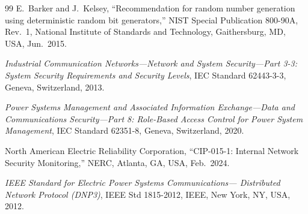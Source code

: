 \documentclass[conference]{IEEEtran}
\begin{document}
\begin{thebibliography}{99}
E.~Barker and J.~Kelsey, ``Recommendation for random number
generation using deterministic random bit generators,'' NIST Special
Publication 800-90A, Rev.~1, National Institute of Standards and
Technology, Gaithersburg, MD, USA, Jun.~2015.

\emph{Industrial Communication Networks---Network and System
Security---Part 3-3: System Security Requirements and Security
Levels}, IEC Standard 62443-3-3, Geneva, Switzerland, 2013.

\emph{Power Systems Management and Associated Information
Exchange---Data and Communications Security---Part 8: Role-Based
Access Control for Power System Management}, IEC Standard 62351-8,
Geneva, Switzerland, 2020.

North American Electric Reliability Corporation, ``CIP-015-1:
Internal Network Security Monitoring,'' NERC, Atlanta, GA, USA,
Feb.~2024.

\emph{IEEE Standard for Electric Power Systems Communications---%
Distributed Network Protocol (DNP3)}, IEEE Std 1815-2012, IEEE,
New York, NY, USA, 2012.

\end{thebibliography}
\end{document}
